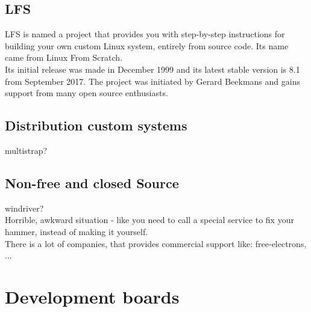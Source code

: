 \documentclass[printmode]{mgr}
\begin{document}
\section{LFS}


LFS is named a project that provides you with step-by-step instructions for building your own custom Linux system, entirely from source code. Its name came from Linux From Scratch.
\\
Its initial release was made in December 1999 and its latest stable version is 8.1 from September 2017. The project was initiated by Gerard Beekmans and gains support from many open source enthusiasts.

\section{Distribution custom systems}

multistrap?

\section{Non-free and closed Source}

windriver? \\
Horrible, awkward situation - like you need to call a special service to fix your hammer, instead of making it yourself. \\
There is a lot of companies, that provides commercial support like: free-electrons, ...



\chapter{Development boards}
\label{section:development-boards}
\end{document}
